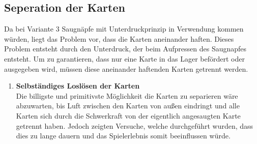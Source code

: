 \subsection{Seperation der Karten}
Da bei Variante 3 Saugnäpfe mit Unterdruckprinzip in Verwendung kommen würden, liegt das Problem vor,
dass die Karten aneinander haften. Dieses Problem entsteht durch den Unterdruck, der beim Aufpressen des Saugnapfes entsteht.
Um zu garantieren, dass nur eine Karte in das Lager befördert oder ausgegeben wird, müssen diese aneinander haftenden Karten getrennt werden.

\begin{enumerate}
    \item \textbf{Selbständiges Loslösen der Karten}\\
    Die billigste und primitivste Möglichkeit die Karten zu separieren wäre abzuwarten, bis Luft zwischen den Karten von außen eindringt und alle Karten sich durch die Schwerkraft
    von der eigentlich angesaugten Karte getrennt haben.
    Jedoch zeigten Versuche, welche durchgeführt wurden, dass dies zu lange dauern und das Spielerlebnis somit beeinflussen würde.


\end{enumerate}
